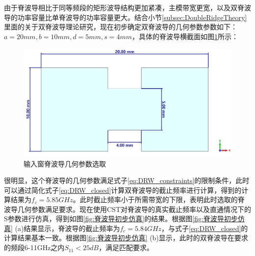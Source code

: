 \documentclass[master]{thesis-uestc}
\begin{document}
由于脊波导相比于同等频段的矩形波导结构更加紧凑，主模带宽更宽，以及双脊波导的功率容量比单脊波导的功率容量更大。结合小节\ref{subsec:DoubleRidgeTheory}里面的关于双脊波导理论研究，现在初步确定双脊波导的几何参数参数如下：$a=20mm, b=10mm, d=5mm, s=4mm $，具体的脊波导横截面如图\ref{fig:6-11GHzDRW}所示：
\begin{figure}[!htb]
    \includegraphics[width=0.7\linewidth]{pic/chapter3/6-11GHzDRW.png}
    \caption{输入窗脊波导几何参数选取}
    \label{fig:6-11GHzDRW}
\end{figure}

很明显，这个脊波导的几何参数满足式子\ref{eq:DRW_constraints}的限制条件，此时可以通过简化式子\ref{eq:DRW_closed}计算双脊波导的截止频率进行计算，得到的计算结果为$f_c=5.85GHz$。此时截止频率小于所需带宽的下限，表明此时选取的脊波导几何参数满足要求。现在使用CST对脊波导的真实截止频率以及直通情况下的S参数进行仿真，得到如图\ref{fig:脊波导初步仿真}的结果。根据图\ref{fig:脊波导初步仿真} (a)结果显示，脊波导的截止频率为$f_c=5.84GHz$，与式子\ref{eq:DRW_closed}的计算结果基本一致。根据图\ref{fig:脊波导初步仿真} (b)显示，此时的双脊波导在要求的频段6-11GHz之内$S_{11}<25dB$，满足匹配要求。
\end{document}
